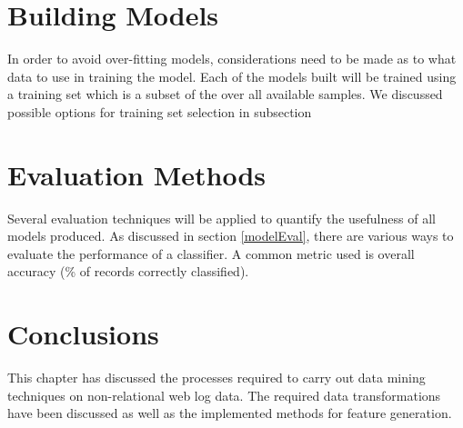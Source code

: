 \section{Building Models}
In order to avoid over-fitting models, considerations need to be made as to what data to use in training the model. Each of the models built will be trained using a training set which is a subset of the over all available samples. We discussed possible options for training set selection in subsection


\section{Evaluation Methods}
Several evaluation techniques will be applied to quantify the usefulness of all models produced. As discussed in section \ref{modelEval}, there are various ways to evaluate the performance of a classifier. A common metric used is overall accuracy (\% of records correctly classified). 


\section{Conclusions}\label{desConc}
This chapter has discussed the processes required to carry out data mining techniques on non-relational web log data. The required data transformations have been discussed as well as the implemented methods for feature generation.



